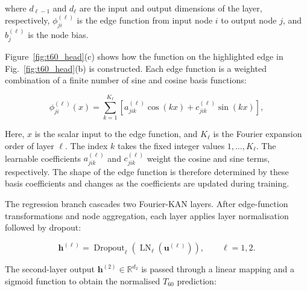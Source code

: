 \documentclass[a4paper,fleqn]{cas-sc}
\begin{document}

\noindent where $d_{\ell-1}$ and $d_\ell$ are the input and output dimensions of the layer, respectively, $\phi_{ji}^{(\ell)}$ is the edge function from input node $i$ to output node $j$, and $b_j^{(\ell)}$ is the node bias.



Figure~\ref{fig:t60_head}(c) shows how the function on the highlighted edge in Fig.~\ref{fig:t60_head}(b) is constructed. Each edge function is a weighted combination of a finite number of sine and cosine basis functions:



\begin{equation}
\phi_{ji}^{(\ell)}(x)
=
\sum_{k=1}^{K_\ell}
\left[
a_{jik}^{(\ell)}\cos(kx)
+
c_{jik}^{(\ell)}\sin(kx)
\right], \tag{13}\label{eq:fourier_edge}
\end{equation}



\noindent Here, $x$ is the scalar input to the edge function, and $K_\ell$ is the Fourier expansion order of layer $\ell$. The index $k$ takes the fixed integer values $1,\ldots,K_\ell$. The learnable coefficients $a_{jik}^{(\ell)}$ and $c_{jik}^{(\ell)}$ weight the cosine and sine terms, respectively. The shape of the edge function is therefore determined by these basis coefficients and changes as the coefficients are updated during training.



The regression branch cascades two Fourier-KAN layers. After edge-function transformations and node aggregation, each layer applies layer normalisation followed by dropout:



\begin{equation}
\mathbf h^{(\ell)}
=
\operatorname{Dropout}_{\ell}
\left(
\operatorname{LN}_{\ell}
\left(\mathbf u^{(\ell)}\right)
\right),
\qquad \ell=1,2. \tag{14}\label{eq:kan_post}
\end{equation}



The second-layer output $\mathbf h^{(2)}\in\mathbb R^{d_2}$ is passed through a linear mapping and a sigmoid function to obtain the normalised $T_{60}$ prediction:
\end{document}
